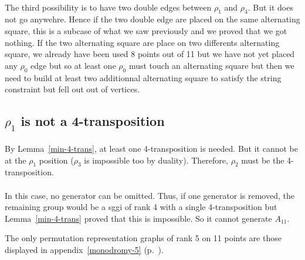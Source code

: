 \paragraph{}
The third possibility is to have two double edges between $\rho_1$ and $\rho_4$. But it does not go anywehre. Hence if the two double edge are placed on the same alternating square, this is a subcase of what we saw previously and we proved that we got nothing. If the two alternating square are place on two differents alternating square, we already have been used 8 points out of 11 but we have not yet placed any $\rho_0$ edge but so at least one $\rho_0$ must touch an alternating square but then we need to build at least two additionnal alternating square to satisfy the string constraint but fell out out of vertices.

\subsection{$\rho_1$ is not a 4-transposition}

\paragraph{}
By Lemma~\ref{min-4-trans}, at least one 4-transposition is needed. But it cannot be at the $\rho_1$ position ($\rho_3$ is impossible too by duality). Therefore, $\rho_2$ must be the 4-transposition.

\paragraph{}
In this case, no generator can be omitted. Thus, if one generator is removed, the remaining group would be a sggi of rank 4 with a single 4-transposition but Lemma~\ref{min-4-trans} proved that this is impossible. So it cannot generate $A_{11}$.

\begin{theorem}
  The only permutation representation graphs of rank 5 on 11 points are those displayed in appendix~\ref{monodromy-5} (p.~\pageref{monodromy-5}).
\end{theorem}

